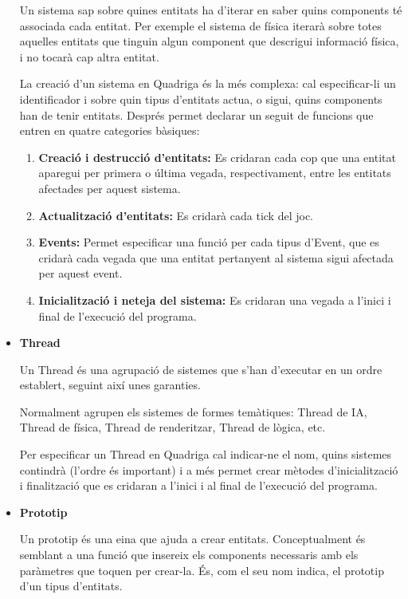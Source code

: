 \begin{itemize}
      Un sistema sap sobre quines entitats ha d'iterar en saber quins components té associada cada entitat. Per exemple el sistema de física iterarà sobre totes aquelles entitats que tinguin algun component que descrigui informació física, i no tocarà cap altra entitat.

      La creació d'un sistema en Quadriga és la més complexa: cal especificar-li un identificador i sobre quin tipus d'entitats actua, o sigui, quins components han de tenir entitats. Després permet declarar un seguit de funcions que entren en quatre categories bàsiques:
      
      \begin{enumerate}
        \item {\bf Creació i destrucció d'entitats:} Es cridaran cada cop que una entitat aparegui per primera o última vegada, respectivament, entre les entitats afectades per aquest sistema.
        \item {\bf Actualització d'entitats:} Es cridarà cada tick del joc.
        \item {\bf Events:} Permet especificar una funció per cada tipus d'Event, que es cridarà cada vegada que una entitat pertanyent al sistema sigui afectada per aquest event.
        \item {\bf Inicialització i neteja del sistema:} Es cridaran una vegada a l'inici i final de l'execució del programa.
      \end{enumerate}
      
    \item{\bf Thread}

      Un Thread és una agrupació de sistemes que s'han d'executar en un ordre establert, seguint així unes garanties.
      
      Normalment agrupen els sistemes de formes temàtiques: Thread de IA, Thread de física, Thread de renderitzar, Thread de lògica, etc.
      
      Per especificar un Thread en Quadriga cal indicar-ne el nom, quins sistemes contindrà (l'ordre és important) i a més permet crear mètodes d'inicialització i finalització que es cridaran a l'inici i al final de l'execució del programa.

    \item{\bf Prototip}

      Un prototip és una eina que ajuda a crear entitats. Conceptualment és semblant a una funció que insereix els components necessaris amb els paràmetres que toquen per crear-la. És, com el seu nom indica, el prototip d'un tipus d'entitats.
      

\end{itemize}
